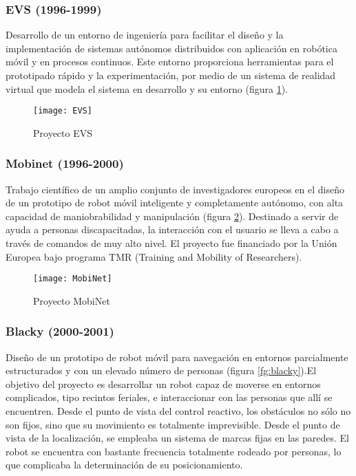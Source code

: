 \subsubsection{EVS (1996-1999)}
Desarrollo de un entorno de ingeniería para facilitar el diseño y la implementación de sistemas autónomos distribuidos con aplicación en robótica móvil y en procesos continuos. Este entorno proporciona herramientas para el prototipado rápido y la experimentación, por medio de un sistema de realidad virtual que modela el sistema en desarrollo y su entorno (figura \ref{fg:EVS}).

\begin{figure}[hbt]
  \centering\texttt{[image: EVS]}\\
  \caption{Proyecto EVS}\label{fg:EVS}
\end{figure}


\subsubsection{Mobinet (1996-2000)}
Trabajo científico de un amplio conjunto de investigadores europeos en el diseño de un prototipo de robot móvil inteligente y completamente autónomo, con alta capacidad de maniobrabilidad y manipulación (figura \ref{fg:mobinet}). Destinado a servir de ayuda a personas discapacitadas, la interacción con el usuario se lleva a cabo a través de comandos de muy alto nivel. El proyecto fue financiado por la Unión Europea bajo programa TMR (Training and Mobility of Researchers).

\begin{figure}[hbt]
 \centering\texttt{[image: MobiNet]}\\
  \caption{Proyecto MobiNet}\label{fg:mobinet}
\end{figure}


\subsubsection{Blacky (2000-2001)}
Diseño de un prototipo de robot móvil para navegación en entornos parcialmente estructurados y con un elevado número de personas (figura \ref{fg:blacky}).El objetivo del proyecto es desarrollar un robot capaz de moverse en entornos complicados, tipo recintos feriales, e interaccionar con las personas que allí se encuentren.
Desde el punto de vista del control reactivo, los obstáculos no sólo no son fijos, sino que su movimiento es
totalmente imprevisible. Desde el punto de vista de la localización, se empleaba un sistema de marcas fijas en las paredes. El robot se encuentra con bastante frecuencia totalmente rodeado por personas, lo que complicaba la determinación de su posicionamiento.

